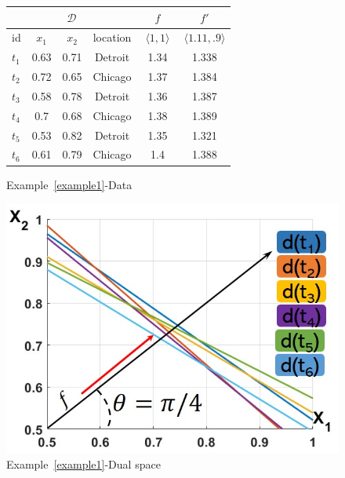 \begin{figure}[!tb]
\begin{minipage}[t]{0.39\textwidth}
\centering
\small
\vspace{-38mm}
    \begin{tabular}{|l|c|c|@{}c@{}||@{}c@{}|@{}c@{}|}
	\hline
	\multicolumn{4}{|c||}{$\mathcal{D}$} & $f$&$f'$ \\ \hline
	id   & $x_1$ & $x_2$ & location&$ \; \langle 1, 1 \rangle \;$&$\langle 1.11, .9 \rangle$ \\ \hline \hline
	$t_1$& 0.63 & 0.71&Detroit&1.34&1.338 \\ \hline
	$t_2$& 0.72 & 0.65&Chicago&1.37&1.384 \\ \hline
	$t_3$& 0.58 & 0.78&Detroit&1.36&1.387 \\ \hline
    $t_4$& 0.7 & 0.68&Chicago&1.38&1.389 \\ \hline
	$t_5$& 0.53 & 0.82&Detroit&1.35&1.321 \\ \hline
	$t_6$& 0.61 & 0.79&Chicago&1.4&1.388 \\ \hline
	\end{tabular}
    \vspace{-1mm}\caption{Example~\ref{example1}-Data}
    \label{fig:toyexample:data}
\end{minipage}
\hfill
\begin{minipage}[t]{0.32\textwidth}
\centering
    \includegraphics[width=\textwidth]{figs/dualspace.jpg}
    \vspace{-10mm}\caption{Example~\ref{example1}-Dual space}
    \label{fig:toyexample:dual}
\end{minipage}

\end{figure}
